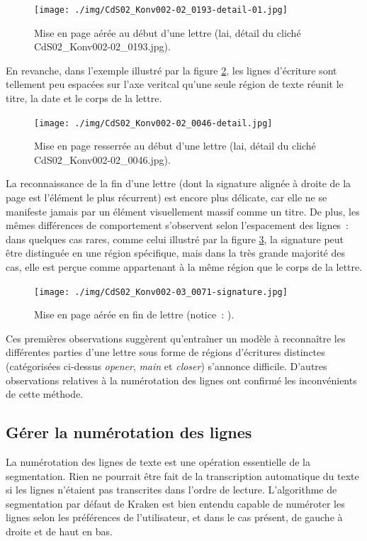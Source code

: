 \documentclass[a4paper,12pt,twoside]{book}
\begin{document}
				\begin{figure}[!h]
					\centering
					\texttt{[image: ./img/CdS02\_Konv002-02\_0193-detail-01.jpg]}%
					\caption{Mise en page aérée au début d'une lettre (\gls{lai}, détail du cliché CdS02\_Konv002-02\_0193.jpg).}%
					\label{seg-opener-193}
				\end{figure}
			
				En revanche, dans l'exemple illustré par la figure \ref{seg-glob-46}, les lignes d'écriture sont tellement peu espacées sur l'axe veritcal qu'une seule région de texte réunit le titre, la date et le corps de la lettre.
			
				\begin{figure}[!h]
					\centering
					\texttt{[image: ./img/CdS02\_Konv002-02\_0046-detail.jpg]}%
					\caption{Mise en page resserrée au début d'une lettre (\gls{lai}, détail du cliché CdS02\_Konv002-02\_0046.jpg).}%
					\label{seg-glob-46}%
				\end{figure}
				
				La reconnaissance de la fin d'une lettre (dont la signature alignée à droite de la page est l'élément le plus récurrent) est encore plus délicate, car elle ne se manifeste jamais par un élément visuellement massif comme un titre. De plus, les mêmes différences de comportement s'observent selon l'espacement des lignes~: dans quelques cas rares, comme celui illustré par la figure \ref{seg-signaure-71}, la signature peut être distinguée en une région spécifique, mais dans la très grande majorité des cas, elle est perçue comme appartenant à la même région que le corps de la lettre.
				
				\begin{figure}[!h]
					\centering
					\texttt{[image: ./img/CdS02\_Konv002-03\_0071-signature.jpg]}%
					\caption{Mise en page aérée en fin de lettre (notice~: \cite{CdS02070071}).}%
					\label{seg-signaure-71}%
				\end{figure}
				
				Ces premières observations suggèrent qu'entraîner un modèle à reconnaître les différentes parties d'une lettre sous forme de régions d'écritures distinctes (catégorisées ci-dessus \textit{opener}, \textit{main} et \textit{closer}) s'annonce difficile. D'autres observations relatives à la numérotation des lignes ont confirmé les inconvénients de cette méthode.
				
			\subsection{Gérer la numérotation des lignes}
				La numérotation des lignes de texte est une opération essentielle de la \gls{segmentation}. Rien ne pourrait être fait de la transcription automatique du texte si les lignes n'étaient pas transcrites dans l'ordre de lecture. L'algorithme de \gls{segmentation} par défaut de Kraken est bien entendu capable de numéroter les lignes selon les préférences de l'utilisateur, et dans le cas présent, de gauche à droite et de haut en bas.
				
\end{document}
